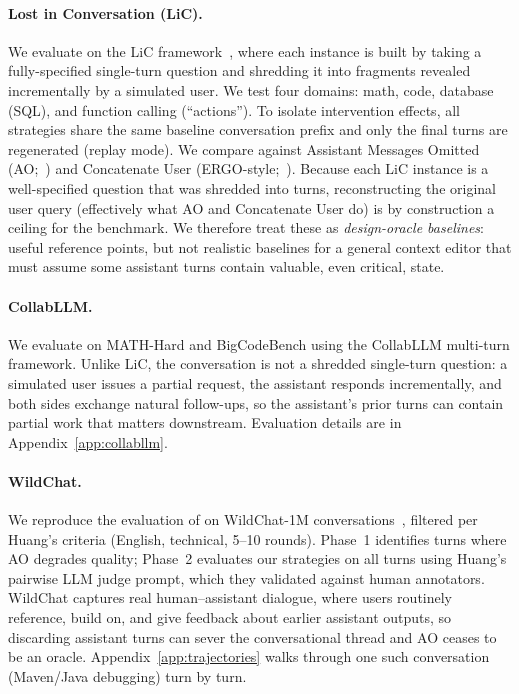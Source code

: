 \documentclass{article}
\begin{document}
\paragraph{Lost in Conversation (LiC).}
We evaluate on the LiC framework~\citep{laban2025lost}, where each instance is built by taking a fully-specified single-turn question and shredding it into fragments revealed incrementally by a simulated user. We test four domains: math, code, database (SQL), and function calling (``actions''). To isolate intervention effects, all strategies share the same baseline conversation prefix and only the final turns are regenerated (replay mode). We compare against Assistant Messages Omitted (AO;~\citealt{huang2026context}) and Concatenate User (ERGO-style;~\citealt{khalid2025ergo}). Because each LiC instance is a well-specified question that was shredded into turns, reconstructing the original user query (effectively what AO and Concatenate User do) is by construction a ceiling for the benchmark. We therefore treat these as \emph{design-oracle baselines}: useful reference points, but not realistic baselines for a general context editor that must assume some assistant turns contain valuable, even critical, state.

\paragraph{CollabLLM.}
We evaluate on MATH-Hard and BigCodeBench using the CollabLLM multi-turn framework. Unlike LiC, the conversation is not a shredded single-turn question: a simulated user issues a partial request, the assistant responds incrementally, and both sides exchange natural follow-ups, so the assistant's prior turns can contain partial work that matters downstream. Evaluation details are in Appendix~\ref{app:collabllm}.

\paragraph{WildChat.}
We reproduce the evaluation of \citet{huang2026context} on WildChat-1M conversations~\citep{zhao2024wildchat}, filtered per Huang's criteria (English, technical, 5--10 rounds). Phase~1 identifies turns where AO degrades quality; Phase~2 evaluates our strategies on all turns using Huang's pairwise LLM judge prompt, which they validated against human annotators. WildChat captures real human--assistant dialogue, where users routinely reference, build on, and give feedback about earlier assistant outputs, so discarding assistant turns can sever the conversational thread and AO ceases to be an oracle. Appendix~\ref{app:trajectories} walks through one such conversation (Maven/Java debugging) turn by turn.
\end{document}
